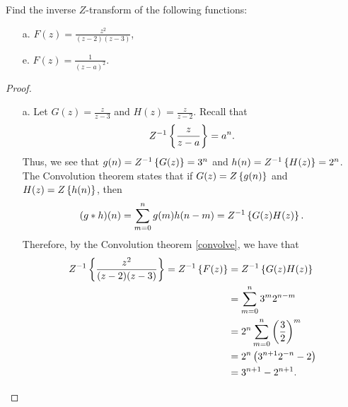 \begin{problem}{12.6}
  Find the inverse $Z$-transform of the following functions:
  \begin{enumerate}
    \item[a.] $\displaystyle F(z) = \frac{z^2}{(z-2)(z-3)}$,
    \item[e.] $\displaystyle F(z) = \frac{1}{(z-a)^2}$.
  \end{enumerate}
\end{problem}

\begin{proof}
  \begin{enumerate}
    \item[a.] Let $\displaystyle G(z) = \frac{z}{z-3}$ and $\displaystyle H(z) = \frac{z}{z-2}$.
      Recall that
      \begin{align*}
        Z^{-1}\left\{ {\frac{z}{z-a}} \right\} = a^n.
      \end{align*}
      Thus, we see that $g(n) = Z^{-1}\left\{ {G(z)} \right\} = 3^n$ and $h(n) = Z^{-1}\left\{ {H(z)} \right\} = 2^n$.
      The Convolution theorem states that if $G(z) = Z\left\{ {g(n)} \right\}$ and $H(z) = Z\left\{ {h(n)} \right\}$, then
      \begin{align}
        \label{convolve}
        (g \ast h)(n) = \sum_{m=0}^n g(m) h(n-m) = Z^{-1}\left\{ {G(z)H(z)} \right\}.
      \end{align}
      Therefore, by the Convolution theorem \eqref{convolve}, we have that
      \begin{align*}
        Z^{-1}\left\{ {\frac{z^2}{(z-2)(z-3)}} \right\} = Z^{-1}\left\{ {F(z)} \right\} &= Z^{-1}\left\{ {G(z) H(z)} \right\} \\
        &= \sum_{m=0}^n 3^m 2^{n-m} \\
        &= 2^n \sum_{m=0}^n \left(\frac{3}{2}\right)^m\\
        &= 2^n \left(3^{n+1}2^{-n} - 2\right)\\
        &= 3^{n+1} - 2^{n+1}.
      \end{align*}


\end{enumerate}
\end{proof}
